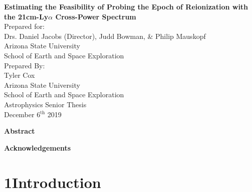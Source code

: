 \documentclass[12pt]{article}
\begin{document}
\doublespacing
\thispagestyle{empty}
\newpage
{}

\begin{center}
	{\Large \textbf{Estimating the Feasibility of Probing the Epoch of Reionization with the
									21cm-Ly$\alpha$ Cross-Power Spectrum}} \\
	[0.15\textheight]

	Prepared for: \\
	Drs. Daniel Jacobs (Director), Judd Bowman, \&  Philip Mauskopf\\
	Arizona State University \\
	School of Earth and Space Exploration \\[0.15\textheight]

	Prepared By: \\
	Tyler Cox \\
	Arizona State University \\
	School of Earth and Space Exploration \\
	Astrophysics Senior Thesis \\
	December 6$^{\textrm{th}}$ 2019 \\
	[0.15\textheight]

\end{center}
\thispagestyle{empty}

\clearpage
{}

\begin{center}
	\textbf{Abstract}
\end{center}



\begingroup
\hypersetup{
	citecolor=DarkBlue,
	filecolor=black,
	linkcolor=black,
	urlcolor=DarkBlue
}
\renewcommand{\thesection}{\Roman{section}}
\tableofcontents
\listoffigures
\endgroup

\newpage

	\begin{center}
		\textbf{Acknowledgements}
	\end{center}

		




\tocless\section{\hypertarget{sec:introduction}{1\hspace{0.75em}Introduction}}
\end{document}
